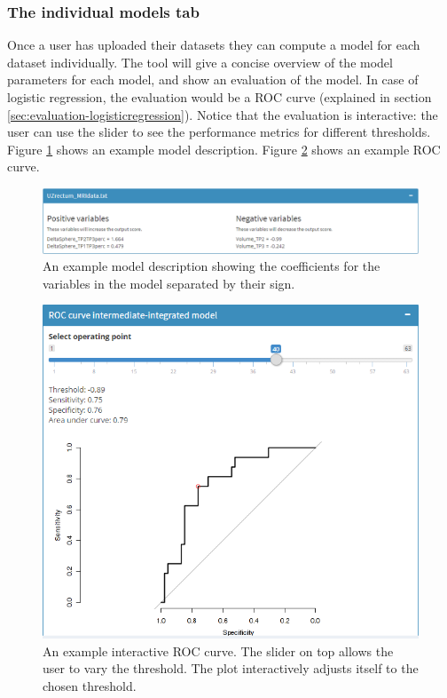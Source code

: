 \subsubsection{The individual models tab}
Once a user has uploaded their datasets they can compute a model for each dataset individually. The tool will give a concise overview of the model parameters for each model, and show an evaluation of the model. In case of logistic regression, the evaluation would be a ROC curve (explained in section \ref{sec:evaluation-logisticregression}). Notice that the evaluation is interactive: the user can use the slider to see the performance metrics for different thresholds. Figure \ref{fig:tool-model} shows an example model description. Figure \ref{fig:tool-roc} shows an example ROC curve.
\begin{figure}
	\centering
	\includegraphics[scale=.4]{images/tool_model_mri}
	\caption{An example model description showing the coefficients for the variables in the model separated by their sign.}
	\label{fig:tool-model}
\end{figure}
\begin{figure}
	\centering
	\includegraphics[scale=.65]{images/tool_auc}
	\caption{An example interactive ROC curve. The slider on top allows the user to vary the threshold. The plot interactively adjusts itself to the chosen threshold.}
	\label{fig:tool-roc}
\end{figure}
